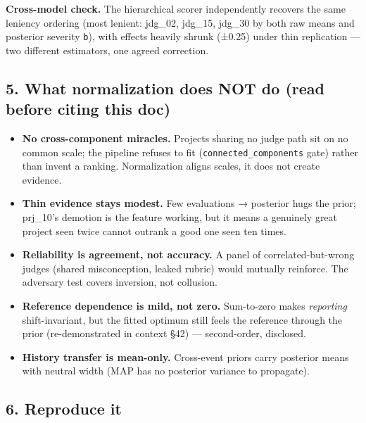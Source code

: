 \documentclass[
  11pt,
]{article}
\providecommand{\tightlist}{%
  \setlength{\itemsep}{0pt}\setlength{\parskip}{0pt}}
\begin{document}
\textbf{Cross-model check.} The hierarchical scorer independently
recovers the same leniency ordering (most lenient: jdg\_02, jdg\_15,
jdg\_30 by both raw means and posterior severity \texttt{b}), with
effects heavily shrunk (±0.25) under thin replication --- two different
estimators, one agreed correction.

\hypertarget{what-normalization-does-not-do-read-before-citing-this-doc}{%
\subsection{5. What normalization does NOT do (read before citing this
doc)}\label{what-normalization-does-not-do-read-before-citing-this-doc}}

\begin{itemize}
\tightlist
\item
  \textbf{No cross-component miracles.} Projects sharing no judge path
  sit on no common scale; the pipeline refuses to fit
  (\texttt{connected\_components} gate) rather than invent a ranking.
  Normalization aligns scales, it does not create evidence.
\item
  \textbf{Thin evidence stays modest.} Few evaluations → posterior hugs
  the prior; prj\_10's demotion is the feature working, but it means a
  genuinely great project seen twice cannot outrank a good one seen ten
  times.
\item
  \textbf{Reliability is agreement, not accuracy.} A panel of
  correlated-but-wrong judges (shared misconception, leaked rubric)
  would mutually reinforce. The adversary test covers inversion, not
  collusion.
\item
  \textbf{Reference dependence is mild, not zero.} Sum-to-zero makes
  \emph{reporting} shift-invariant, but the fitted optimum still feels
  the reference through the prior (re-demonstrated in context §42) ---
  second-order, disclosed.
\item
  \textbf{History transfer is mean-only.} Cross-event priors carry
  posterior means with neutral width (MAP has no posterior variance to
  propagate).
\end{itemize}

\hypertarget{reproduce-it}{%
\subsection{6. Reproduce it}\label{reproduce-it}}
\end{document}
